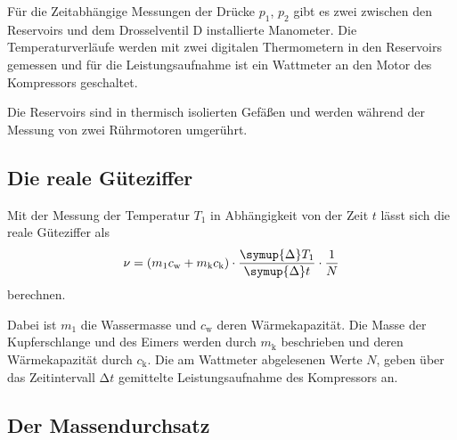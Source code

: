 Für die Zeitabhängige Messungen der Drücke $p_1$, $p_2$ gibt es zwei zwischen den Reservoirs und dem Drosselventil D installierte Manometer. Die 
Temperaturverläufe werden mit zwei digitalen Thermometern in den Reservoirs gemessen und für die Leistungsaufnahme ist ein Wattmeter an den Motor des Kompressors geschaltet.

Die Reservoirs sind in thermisch isolierten Gefäßen und werden während der Messung von zwei Rührmotoren umgerührt.

\subsection{Die reale Güteziffer}
Mit der Messung der Temperatur $T_1$ in Abhängigkeit von der Zeit $t$ lässt sich die reale Güteziffer als 
\begin{equation}
    \nu = (m_1 c_\text{w} + m_\text{k} c_\text{k})\cdot 
    \frac{\symup{\Delta} T_1}{\symup{\Delta} t} \cdot \frac{1}{N}
    \label{eqn:Güteziffer}
\end{equation}
berechnen.

Dabei ist $m_1$ die Wassermasse und $c_\text{w}$ deren Wärmekapazität. Die Masse der Kupferschlange und des Eimers werden durch $m_\text{k}$ beschrieben und deren Wärmekapazität
durch $c_\text{k}$. Die am Wattmeter abgelesenen Werte $N$, geben über das Zeitintervall $\increment t$ gemittelte Leistungsaufnahme des Kompressors an.

\subsection{Der Massendurchsatz}

